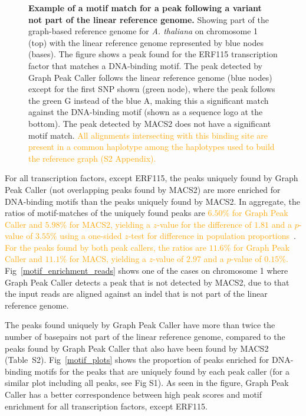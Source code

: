 \documentclass[10pt,letterpaper]{article}
\newcommand{\revision}[1]{\textcolor{orange}{#1}}
\begin{document}
\begin{figure} %
 \caption{{\bf Example of a motif match for a peak following a variant not part of the linear reference genome.} Showing part of the graph-based reference genome for \emph{A. thaliana} on chromosome 1 (top) with the linear reference genome represented by blue nodes (bases). The figure shows a peak found for the ERF115 transcription
factor that matches a DNA-binding motif. The peak detected by Graph Peak Caller follows the linear reference genome (blue nodes) except for the first SNP shown (green node), where the peak follows the green G instead of the blue A, making this a significant match against the DNA-binding motif (shown as a sequence logo at the bottom). The peak detected by MACS2 does not have a significant motif match. \revision{All alignments intersecting with this binding site are present in a common haplotype among the haplotypes used to build the reference graph (S2 Appendix).}}
\label{motif_enrichment}
\end{figure}


For all transcription factors, except ERF115, the peaks uniquely found by Graph Peak Caller (not overlapping peaks found by MACS2) are more enriched for DNA-binding motifs than the peaks uniquely found by MACS2. In aggregate, the ratios of motif-matches of the uniquely found peaks are \revision{$6.50\%$ for Graph Peak Caller and $5.98\%$ for MACS2, yielding a $z$-value for the difference of \revision{$1.81$ and a $p$-value of $3.55\%$} using a one-sided $z$-test for difference in population proportions~\cite{devoreberk}}. \revision{For the peaks found by both peak callers, the ratios are $11.6$\% for Graph Peak Caller and $11.1$\% for MACS, yielding a $z$-value of $2.97$ and a $p$-value of $0.15$\%.} Fig~\ref{motif_enrichment_reads} shows one of the cases on chromosome 1 where Graph Peak Caller detects a peak that is not detected by MACS2, due to that the input reads are aligned against an indel that is not part of the linear reference genome. 

The peaks found uniquely by Graph Peak Caller have more than twice the number of basepairs not part of the linear reference genome, compared to the peaks found by Graph Peak Caller that also have been found by MACS2 (Table~S2). Fig~\ref{motif_plots} shows the proportion of peaks enriched for DNA-binding motifs for the peaks that are uniquely found by each peak caller (for a similar plot including all peaks, see Fig S1). As seen in the figure, Graph Peak Caller has a better correspondence between high peak scores and motif enrichment for all transcription factors, except ERF115. 
\end{document}
